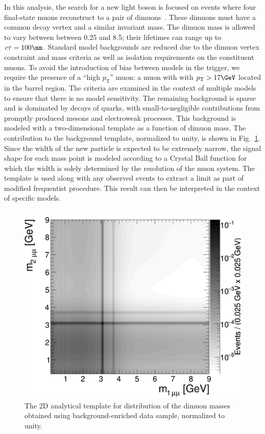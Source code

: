 In this analysis, the search for a new light boson is focused on events where four final-state muons reconstruct to a pair of dimuons~\cite{CMS-PAS-HIG-18-003}. These dimuons must have a common decay vertex and a similar invariant mass. The dimuon mass is allowed to vary between between 0.25 and 8.5\GeV; their lifetimes can range up to $c\tau=100\mm$. Standard model backgrounds are reduced due to the dimuon vertex constraint and mass criteria as well as isolation requirements on the constituent muons. To avoid the introduction of bias between models in the trigger, we require the presence of a ``high $p_\mathrm{T}$'' muon: a muon with with $p_\mathrm{T} > 17\GeV$ located in the barrel region. The criteria are examined in the context of multiple models to ensure that there is no model sensitivity. The remaining background is sparse and is dominated by decays of \bbbar quarks, with small-to-negligible contributions from promptly produced \JPsi mesons and electroweak processes. This background is modeled with a two-dimensional template as a function of dimuon mass. The \bbbar contribution to the background template, normalized to unity, is shown in Fig.~\ref{fig:2dtemplate}. Since the width of the new particle is expected to be extremely narrow, the signal shape for each mass point is modeled according to a Crystal Ball \cite{Oreglia:1980cs} function for which the width is solely determined by the resolution of the muon system. The template is used along with any observed events to extract a limit as part of modified frequentist procedure. This result can then be interpreted in the context of specific models.

\begin{figure}[tb]
\begin{center}
\includegraphics[width=0.52\linewidth]{plots/h2_background.png}
\end{center}
\caption{The 2D analytical template for distribution of the dimuon masses obtained using background-enriched data sample, normalized to unity. \label{fig:2dtemplate}}
\end{figure}

